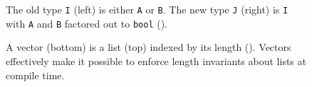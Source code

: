 
\begin{figure}
\begin{minipage}{0.48\columnwidth}

\end{minipage}
\hfill
\begin{minipage}{0.48\columnwidth}

\end{minipage}
\vspace{-0.4cm}
\caption{The old type \lstinline{I} (left) is either \lstinline{A} or \lstinline{B}. The new type \lstinline{J} (right) is \lstinline{I} with \lstinline{A} and \lstinline{B} factored out to \lstinline{bool} ().}
\label{fig:equivalence2}
\end{figure}

\begin{figure}
\begin{minipage}{0.48\textwidth}
   
\end{minipage}
\hfill
\begin{minipage}{0.58\textwidth}
   
\end{minipage}
\vspace{-0.4cm}
\caption{A vector (bottom) is a list (top) indexed by its length (). Vectors effectively make it possible to enforce length invariants about lists at compile time.}
\label{fig:listtovect}
\end{figure}


